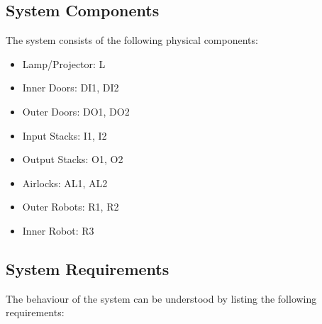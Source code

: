 \documentclass[a4paper,12pt]{article}
\begin{document}
	\subsection{System Components}
	The system consists of the following physical components:
	\begin{itemize}
		\item Lamp/Projector: L
		\item Inner Doors: DI1, DI2
		\item Outer Doors: DO1, DO2
		\item Input Stacks: I1, I2
		\item Output Stacks: O1, O2
		\item Airlocks: AL1, AL2
		\item Outer Robots: R1, R2
		\item Inner Robot: R3
	\end{itemize}
	
	
	\subsection{System Requirements}
	The behaviour of the system can be understood by listing the following requirements:
	
\end{document}
